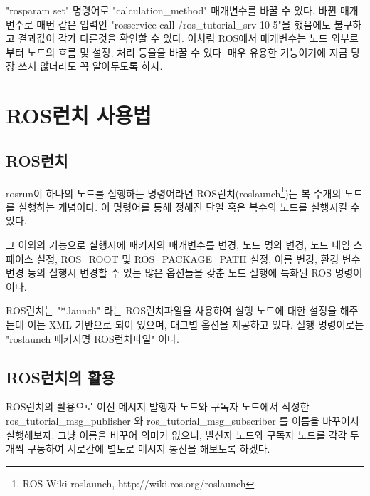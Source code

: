 "rosparam set" 명령어로 "calculation\_method" 매개변수를 바꿀 수 있다. 바뀐 매개변수로 매번 같은 입력인 "rosservice call /ros\_tutorial\_srv 10 5"을 했음에도 불구하고 결과값이 각가 다른것을 확인할 수 있다.  이처럼 ROS에서 매개변수는 노드 외부로부터 노드의 흐름 및 설정, 처리 등을을 바꿀 수 있다. 매우 유용한 기능이기에 지금 당장 쓰지 않더라도 꼭 알아두도록 하자.


\section{ROS런치 사용법}
\label{sec:HowToUseTheRoslaunch}

\subsection{ROS런치}

\begin{definition}[roslaunch]
rosrun이 하나의 노드를 실행하는 명령어라면 ROS런치(roslaunch\footnote{ROS Wiki roslaunch, http://wiki.ros.org/roslaunch})는 복 수개의 노드를 실행하는 개념이다. 이 명령어를 통해 정해진 단일 혹은 복수의 노드를 실행시킬 수 있다. 

그 이외의 기능으로 실행시에 패키지의 매개변수를 변경, 노드 명의 변경, 노드 네임 스페이스 설정, ROS\_ROOT 및 ROS\_PACKAGE\_PATH 설정, 이름 변경, 환경 변수 변경 등의 실행시 변경할 수 있는 많은 옵션들을 갖춘 노드 실행에 특화된 ROS 명령어이다. 

ROS런치는 "*.launch" 라는 ROS런치파일을 사용하여 실행 노드에 대한 설정을 해주는데 이는 XML 기반으로 되어 있으며, 태그별 옵션을 제공하고 있다. 실행 명령어로는 "roslaunch 패키지명 ROS런치파일" 이다.
\end{definition}

\subsection{ROS런치의 활용}

ROS런치의 활용으로 이전 메시지 발행자 노드와 구독자 노드에서 작성한 ros\_tutorial\_msg\_publisher 와  ros\_tutorial\_msg\_subscriber 를 이름을 바꾸어서 실행해보자. 그냥 이름을 바꾸어 의미가 없으니, 발신자 노드와 구독자 노드를 각각 두 개씩 구동하여 서로간에 별도로 메시지 통신을 해보도록 하겠다.

